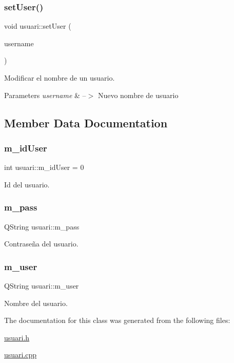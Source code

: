 \subsubsection{\texorpdfstring{set\+User()}{setUser()}}
{\footnotesize\ttfamily void usuari\+::set\+User (\begin{DoxyParamCaption}\item[{Q\+String}]{username }\end{DoxyParamCaption})}



Modificar el nombre de un usuario. 


\begin{DoxyParams}{Parameters}
{\em username} & --$>$ Nuevo nombre de usuario \\
\hline
\end{DoxyParams}


\subsection{Member Data Documentation}
\mbox{\label{classusuari_a782f5e6371fec121527d11ee7bfb1298}} 
\subsubsection{\texorpdfstring{m\+\_\+id\+User}{m\_idUser}}
{\footnotesize\ttfamily int usuari\+::m\+\_\+id\+User = 0\hspace{0.3cm}{\ttfamily [private]}}

Id del usuario. \mbox{\label{classusuari_aa9568f0272be3b558bc2e68911820f9b}} 
\subsubsection{\texorpdfstring{m\+\_\+pass}{m\_pass}}
{\footnotesize\ttfamily Q\+String usuari\+::m\+\_\+pass\hspace{0.3cm}{\ttfamily [private]}}

Contraseña del usuario. \mbox{\label{classusuari_a888f2ca58e20a8396f4d065a943e4425}} 
\subsubsection{\texorpdfstring{m\+\_\+user}{m\_user}}
{\footnotesize\ttfamily Q\+String usuari\+::m\+\_\+user\hspace{0.3cm}{\ttfamily [private]}}

Nombre del usuario. 

The documentation for this class was generated from the following files\+:\begin{DoxyCompactItemize}
\item 
\mbox{\hyperlink{usuari_8h}{usuari.\+h}}\item 
\mbox{\hyperlink{usuari_8cpp}{usuari.\+cpp}}\end{DoxyCompactItemize}
